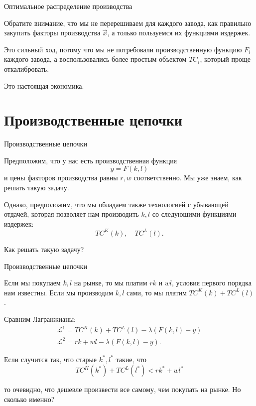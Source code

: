 \documentclass{beamer}
\begin{document}
\begin{frame}{Оптимальное распределение производства}

Обратите внимание, что мы не перерешиваем для каждого завода, как правильно закупить факторы производства $\vec x$, а только пользуемся их функциями издержек. 

Это сильный ход, потому что мы не потребовали производственную функцию $F_i$ каждого завода, а воспользовались более простым объектом $TC_i$, который проще откалибровать.

Это настоящая экономика.

\end{frame}

\section{Производственные цепочки}

\begin{frame}{Производственные цепочки}

Предположим, что у нас есть производственная функция
$$ y = F(k, l)$$
и цены факторов производства равны $r, w$ соответственно. Мы уже знаем, как решать такую задачу. 

Однако, предположим, что мы обладаем также технологией с убывающей отдачей, которая позволяет нам производить $k,l$ со следующими функциями издержек: $$ TC^K(k), \quad TC^L(l).$$ 

Как решать такую задачу?

\end{frame}

\begin{frame}{Производственные цепочки}

Если мы покупаем $k,l$ на рынке, то мы платим $rk$ и $wl$, условия первого порядка нам известны. Если мы производим $k,l$ сами, то мы платим $TC^K(k) + TC^L(l)$. 

Сравним Лагранжианы:
\begin{gather*} 
\mathcal{L}^1 = TC^K(k) + TC^L(l) - \lambda (F(k,l) - y)\\
\mathcal{L}^2 = rk + wl - \lambda (F(k,l) - y).
\end{gather*}


Если случится так, что старые $k^{\ast}, l^{\ast}$ такие, что $$ TC^K(k^{\ast}) + TC^L(l^{\ast}) < rk^{\ast} + wl^{\ast}$$

то очевидно, что дешевле произвести все самому, чем покупать на рынке. Но сколько именно?

\end{frame}
\end{document}

